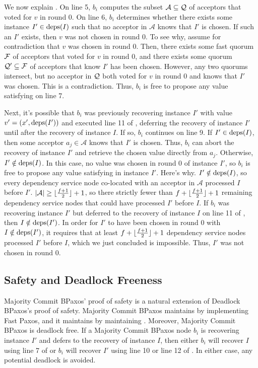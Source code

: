 We now explain . On line 5, $b_i$ computes the
subset $\mathcal{A} \subseteq \mathcal{Q}$ of acceptors that voted for $v$ in round
$0$. On line 6, $b_i$ determines whether there exists some instance $I' \in
\text{deps}(I)$ such that no acceptor in $\mathcal{A}$ knows that $I'$ is chosen. If
such an $I'$ exists, then $v$ was not chosen in round $0$. To see why, assume
for contradiction that $v$ was chosen in round $0$. Then, there exists some
fast quorum $\mathcal{F}$ of acceptors that voted for $v$ in round $0$, and
there exists some quorum $\mathcal{Q}' \subseteq \mathcal{F}$ of acceptors that
know $I'$ has been chosen. However, any two quorums intersect, but no acceptor
in $\mathcal{Q}$ both voted for $v$ in round $0$ and knows that $I'$ was chosen.
This is a contradiction. Thus, $b_i$ is free to propose any value satisfying
 on line 7.

Next, it's possible that $b_i$ was previously recovering instance $I'$ with
value $v' = (x', \text{deps}(I'))$ and executed line 11 of ,
deferring the recovery of instance $I'$ until after the recovery of instance
$I$.
%
If so, $b_i$ continues on line 9. If $I' \in \text{deps}(I)$, then some acceptor $a_j
\in \mathcal{A}$ knows that $I'$ is chosen. Thus, $b_i$ can abort the recovery
of instance $I'$ and retrieve the chosen value directly from $a_j$.
%
Otherwise, $I' \notin \text{deps}(I)$. In this case, no value was chosen in round $0$
of instance $I'$, so $b_i$ is free to propose any value satisfying
 in instance $I'$. Here's why. $I' \notin \text{deps}(I)$,
so every dependency service node co-located with an acceptor in $\mathcal{A}$
processed $I$ before $I'$. $|\mathcal{A}| \geq \lfloor\frac{f + 1}{2}\rfloor + 1$, so there
strictly fewer than $f + \lfloor\frac{f + 1}{2}\rfloor + 1$ remaining dependency service
nodes that could have processed $I'$ before $I$.  If $b_i$ was recovering
instance $I'$ but deferred to the recovery of instance $I$ on line 11 of
, then $I \notin \text{deps}(I')$.  In order for $I'$ to have
been chosen in round $0$ with $I \notin \text{deps}(I')$, it requires that at least
$f + \lfloor\frac{f + 1}{2}\rfloor + 1$ dependency service nodes processed $I'$ before $I$,
which we just concluded is impossible. Thus, $I'$ was not chosen in round $0$.

\subsection{Safety and Deadlock Freeness}
Majority Commit BPaxos' proof of safety is a natural extension of Deadlock
BPaxos's proof of safety. Majority Commit BPaxos maintains
 by implementing Fast Paxos, and it maintains
 by maintaining .
%
Moreover, Majority Commit BPaxos is deadlock free. If a Majority Commit BPaxos
node $b_i$ is recovering instance $I'$ and defers to the recovery of instance
$I$, then either $b_i$ will recover $I$ using line 7 of
 or $b_i$ will recover $I'$ using line 10 or line
12 of . In either case, any potential deadlock is
avoided.
